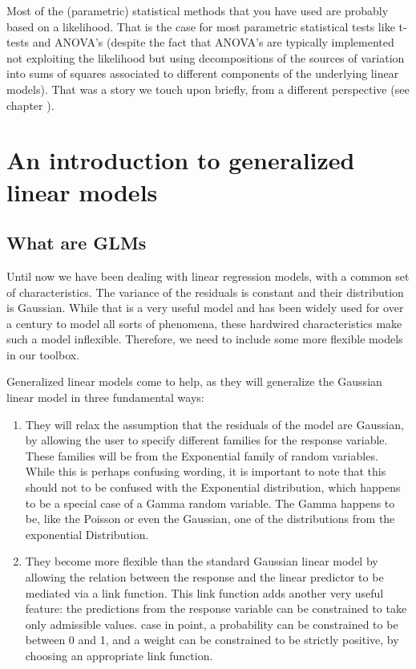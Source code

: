 \documentclass[
]{book}
\begin{document}
Most of the (parametric) statistical methods that you have used are probably based on a likelihood. That is the case for most parametric statistical tests like t-tests and ANOVA's (despite the fact that ANOVA's are typically implemented not exploiting the likelihood but using decompositions of the sources of variation into sums of squares associated to different components of the underlying linear models). That was a story we touch upon briefly, from a different perspective (see chapter ).

\hypertarget{GLMs}{%
\chapter{An introduction to generalized linear models}\label{GLMs}}

\hypertarget{what-are-glms}{%
\section{What are GLMs}\label{what-are-glms}}

Until now we have been dealing with linear regression models, with a common set of characteristics. The variance of the residuals is constant and their distribution is Gaussian. While that is a very useful model and has been widely used for over a century to model all sorts of phenomena, these hardwired characteristics make such a model inflexible. Therefore, we need to include some more flexible models in our toolbox.

Generalized linear models come to help, as they will generalize the Gaussian linear model in three fundamental ways:

\begin{enumerate}
\def\labelenumi{\arabic{enumi}.}
\item
  They will relax the assumption that the residuals of the model are Gaussian, by allowing the user to specify different families for the response variable. These families will be from the Exponential family of random variables. While this is perhaps confusing wording, it is important to note that this should not to be confused with the Exponential distribution, which happens to be a special case of a Gamma random variable. The Gamma happens to be, like the Poisson or even the Gaussian, one of the distributions from the exponential Distribution.
\item
  They become more flexible than the standard Gaussian linear model by allowing the relation between the response and the linear predictor to be mediated via a link function. This link function adds another very useful feature: the predictions from the response variable can be constrained to take only admissible values. case in point, a probability can be constrained to be between 0 and 1, and a weight can be constrained to be strictly positive, by choosing an appropriate link function.
\end{enumerate}
\end{document}
